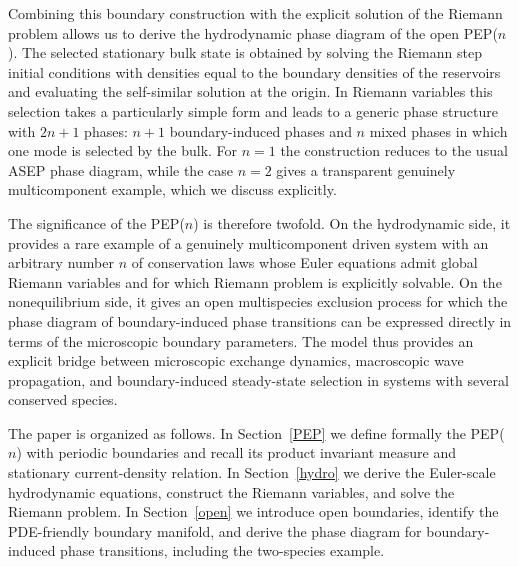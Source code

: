\documentclass[12pt]{article}
\begin{document}
Combining this boundary construction with the explicit solution of the
Riemann problem allows us to derive the hydrodynamic phase diagram of the open
PEP($n$). The selected stationary bulk state is obtained by solving
the Riemann step initial conditions with densities equal to the boundary densities of the reservoirs and evaluating the
self-similar solution at the origin. In Riemann variables this selection
takes a particularly simple form and leads to a generic phase structure
with $2n+1$ phases: $n+1$ boundary-induced phases and $n$ mixed phases in
which one mode is selected by the bulk. For $n=1$ the construction reduces
to the usual ASEP phase diagram, while the case $n=2$ gives a transparent
genuinely multicomponent example, which we discuss explicitly.

The significance of the PEP($n$) is therefore twofold. On the hydrodynamic
side, it provides a rare example of a genuinely
multicomponent driven system with an arbitrary number $n$ of conservation laws whose Euler equations admit global Riemann
variables and for which Riemann problem is explicitly solvable. On the
nonequilibrium side, it gives an open multispecies exclusion process for
which the phase diagram of boundary-induced phase transitions
can be expressed directly in terms of
the microscopic boundary parameters. The model thus provides an explicit
bridge between microscopic exchange dynamics, macroscopic wave
propagation, and boundary-induced steady-state selection in systems with several
conserved species.

The paper is organized as follows. In Section~\ref{PEP} we define formally the
PEP($n$) with periodic boundaries and recall its product invariant
measure and stationary current-density relation. In Section~\ref{hydro} we derive
the Euler-scale hydrodynamic equations, construct the Riemann variables,
and solve the Riemann problem. In Section~\ref{open} we introduce open boundaries,
identify the PDE-friendly boundary manifold, and derive the phase diagram
for boundary-induced phase transitions, including the two-species example.
\end{document}
